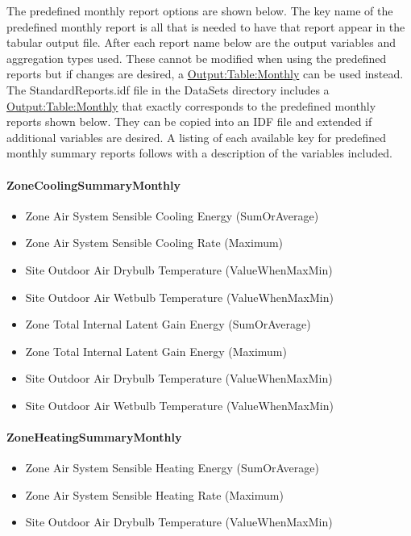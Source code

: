 The predefined monthly report options are shown below. The key name of the predefined monthly report is all that is needed to have that report appear in the tabular output file. After each report name below are the output variables and aggregation types used. These cannot be modified when using the predefined reports but if changes are desired, a \hyperref[outputtablemonthly]{Output:Table:Monthly} can be used instead. The StandardReports.idf file in the DataSets directory includes a \hyperref[outputtablemonthly]{Output:Table:Monthly} that exactly corresponds to the predefined monthly reports shown below. They can be copied into an IDF file and extended if additional variables are desired. A listing of each available key for predefined monthly summary reports follows with a description of the variables included.

\paragraph{ZoneCoolingSummaryMonthly}\label{zonecoolingsummarymonthly}

\begin{itemize}
\item
  Zone Air System Sensible Cooling Energy (SumOrAverage)
\item
  Zone Air System Sensible Cooling Rate (Maximum)
\item
  Site Outdoor Air Drybulb Temperature (ValueWhenMaxMin)
\item
  Site Outdoor Air Wetbulb Temperature (ValueWhenMaxMin)
\item
  Zone Total Internal Latent Gain Energy (SumOrAverage)
\item
  Zone Total Internal Latent Gain Energy (Maximum)
\item
  Site Outdoor Air Drybulb Temperature (ValueWhenMaxMin)
\item
  Site Outdoor Air Wetbulb Temperature (ValueWhenMaxMin)
\end{itemize}

\paragraph{ZoneHeatingSummaryMonthly}\label{zoneheatingsummarymonthly}

\begin{itemize}
\item
  Zone Air System Sensible Heating Energy (SumOrAverage)
\item
  Zone Air System Sensible Heating Rate (Maximum)
\item
  Site Outdoor Air Drybulb Temperature (ValueWhenMaxMin)
\end{itemize}

